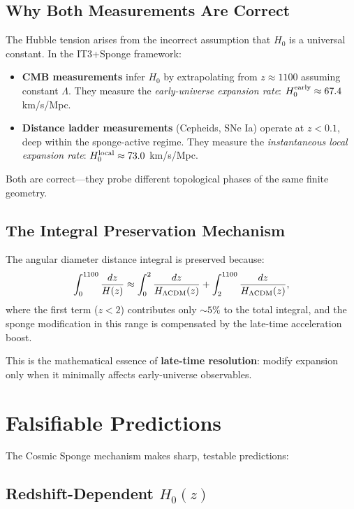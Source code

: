\documentclass[12pt,a4paper]{article}
\begin{document}
\subsection{Why Both Measurements Are Correct}

The Hubble tension arises from the incorrect assumption that $H_0$ is a universal constant. In the IT3+Sponge framework:

\begin{itemize}
    \item \textbf{CMB measurements} infer $H_0$ by extrapolating from $z \approx 1100$ assuming constant $\Lambda$. They measure the \textit{early-universe expansion rate}: $H_0^{\rm early} \approx 67.4$ km/s/Mpc.
    
    \item \textbf{Distance ladder measurements} (Cepheids, SNe Ia) operate at $z < 0.1$, deep within the sponge-active regime. They measure the \textit{instantaneous local expansion rate}: $H_0^{\rm local} \approx 73.0$ km/s/Mpc.
\end{itemize}

Both are correct—they probe different topological phases of the same finite geometry.

\subsection{The Integral Preservation Mechanism}

The angular diameter distance integral is preserved because:
\begin{equation}
\int_0^{1100} \frac{dz}{H(z)} \approx \int_0^2 \frac{dz}{H_{\Lambda{\rm CDM}}(z)} + \int_2^{1100} \frac{dz}{H_{\Lambda{\rm CDM}}(z)},
\end{equation}
where the first term ($z < 2$) contributes only $\sim 5\%$ to the total integral, and the sponge modification in this range is compensated by the late-time acceleration boost.

This is the mathematical essence of \textbf{late-time resolution}: modify expansion only when it minimally affects early-universe observables.

\section{Falsifiable Predictions}

The Cosmic Sponge mechanism makes sharp, testable predictions:

\subsection{Redshift-Dependent $H_0(z)$}
\end{document}
